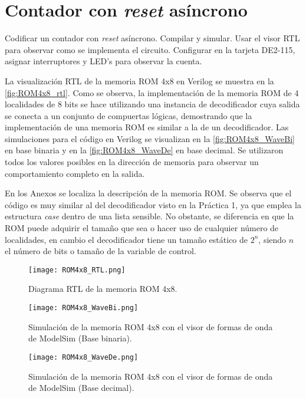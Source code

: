 \section{Contador con \textit{reset} asíncrono \label{sec:s3}}

\begin{center}
	\begin{minipage}{12cm}
		\begin{tcolorbox}[title=Actividad 3]
			 Codificar un contador con \textit{reset} asíncrono. Compilar y simular. Usar el visor RTL para observar como se implementa el circuito. Configurar en la tarjeta DE2-115, asignar interruptores y LED's para observar la cuenta.
		\end{tcolorbox}	
	\end{minipage}
\end{center}

La visualización RTL de la memoria ROM 4x8 en Verilog se muestra en la \autoref{fig:ROM4x8_rtl}. Como se observa, la implementación de la memoria ROM de 4 localidades de 8 bits se hace utilizando una instancia de decodificador cuya salida se conecta a un conjunto de compuertas lógicas, demostrando que la implementación de una memoria ROM es similar a la de un decodificador. Las simulaciones para el código en Verilog se visualizan en la \autoref{fig:ROM4x8_WaveBi} en base binaria y en la \autoref{fig:ROM4x8_WaveDe} en base decimal. Se utilizaron todos los valores posibles en la dirección de memoria para observar un comportamiento completo en la salida.

En los Anexos se localiza la descripción de la memoria ROM. Se observa que el código es muy similar al del decodificador visto en la Práctica 1, ya que emplea la estructura \textit{case} dentro de una lista sensible. No obstante, se diferencia en que la ROM puede adquirir el tamaño que sea o hacer uso de cualquier número de localidades, en cambio el decodificador tiene un tamaño estático de $2^{n}$, siendo $n$ el número de bits o tamaño de la variable de control.

\begin{figure}[ht]
	\centering
	\texttt{[image: ROM4x8\_RTL.png]}
	\caption{Diagrama RTL de la memoria ROM 4x8. \label{fig:ROM4x8_rtl}}
\end{figure}

\begin{figure}[ht]
	\centering
	\texttt{[image: ROM4x8\_WaveBi.png]}
	\caption{Simulación de la memoria ROM 4x8 con el visor de formas de onda de ModelSim (Base binaria). \label{fig:ROM4x8_WaveBi}}
\end{figure}

\begin{figure}[ht]
	\centering
	\texttt{[image: ROM4x8\_WaveDe.png]}
	\caption{Simulación de la memoria ROM 4x8 con el visor de formas de onda de ModelSim (Base decimal). \label{fig:ROM4x8_WaveDe}}
\end{figure}